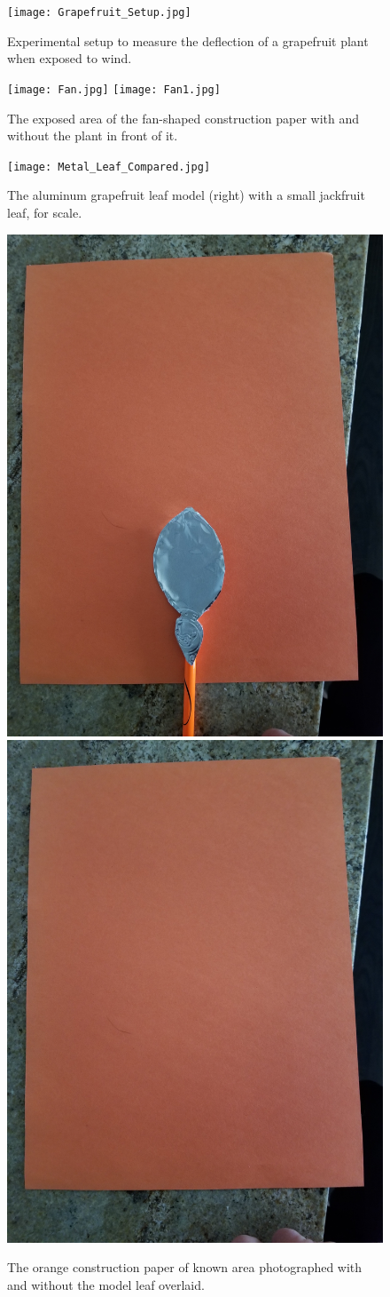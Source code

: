 \begin{figure}
\begin{center}
\texttt{[image: Grapefruit\_Setup.jpg]} 
\end{center}
\caption{Experimental setup to measure the deflection of a grapefruit plant when exposed to wind.}
\label{fig:methods1}
\end{figure}

\begin{figure}
\begin{center}
\texttt{[image: Fan.jpg]}
\texttt{[image: Fan1.jpg]}
\end{center}
\caption{The exposed area of the fan-shaped construction paper with and without the plant in front of it.}
\label{fig:methods2}
\end{figure}

\begin{figure}
\begin{center}
\texttt{[image: Metal\_Leaf\_Compared.jpg]}
\end{center}
\caption{The aluminum grapefruit leaf model (right) with a small jackfruit leaf, for scale.}
\label{fig:methods3}
\end{figure}

\begin{figure}
\begin{center}
\includegraphics[width=0.33\columnwidth]{MetalLeaf.jpg}
\includegraphics[width=0.33\columnwidth]{Paper.jpg}
\end{center}
\caption{The orange construction paper of known area photographed with and without the model leaf overlaid.}
\label{fig:methods4}
\end{figure}

